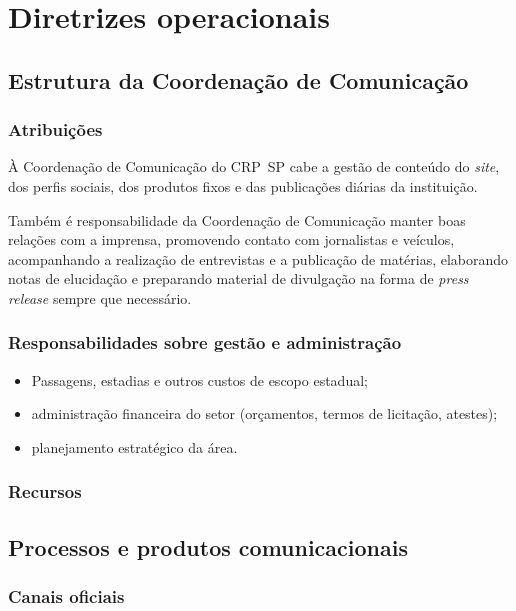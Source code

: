 \chapter{Diretrizes operacionais}

\section{Estrutura da Coordenação de Comunicação}

\subsection{Atribuições}

À Coordenação de Comunicação do CRP~SP cabe a gestão de conteúdo do \emph{site}, dos perfis sociais, dos produtos fixos e das publicações diárias da instituição.

Também é responsabilidade da Coordenação de Comunicação manter boas relações com a imprensa, promovendo contato com jornalistas e veículos, acompanhando a realização de entrevistas e a publicação de matérias, elaborando notas de elucidação e preparando material de divulgação na forma de \emph{press release} sempre que necessário.

\subsection{Responsabilidades sobre gestão e administração}

\begin{itemize}
	\item
	Passagens, estadias e outros custos de escopo estadual;
	\item
	administração financeira do setor (orçamentos, termos de licitação,
	atestes);
	\item
	planejamento estratégico da área.
\end{itemize}

\subsection{Recursos}

\section{Processos e produtos comunicacionais}

\subsection{Canais oficiais}

